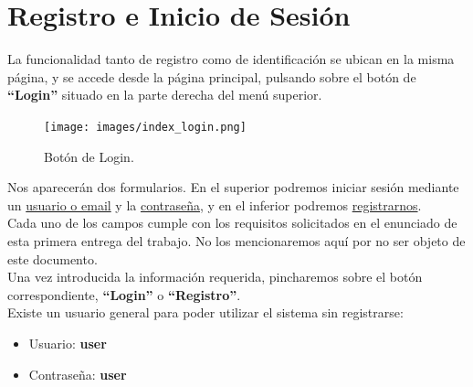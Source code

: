 \documentclass[12pt, twoside]{report}
\begin{document}
\section*{Registro e Inicio de Sesión}
\noindent La funcionalidad tanto de registro como de identificación se ubican en la misma página, y se accede desde la página principal, pulsando sobre el botón de \textbf{``Login''} situado en la parte derecha del menú superior.
\begin{figure}[h]
\begin{center}
\texttt{[image: images/index\_login.png]}
\end{center}
\caption{\label{inicio} Botón de Login.}
\end{figure}
\newline
Nos aparecerán dos formularios. En el superior podremos iniciar sesión mediante un \underline{usuario o email} y la \underline{contraseña}, y en el inferior podremos \underline{registrarnos}.\\
\newline
Cada uno de los campos cumple con los requisitos solicitados en el enunciado de esta primera entrega del trabajo. No los mencionaremos aquí por no ser objeto de este documento.\\
Una vez introducida la información requerida, pincharemos sobre el botón correspondiente, \textbf{``Login''} o \textbf{``Registro''}.\\
\newline
Existe un usuario general para poder utilizar el sistema sin registrarse:
\begin{itemize}
    \item Usuario: \textbf{user}
    \item Contraseña: \textbf{user\\}
\end{itemize}
\end{document}
